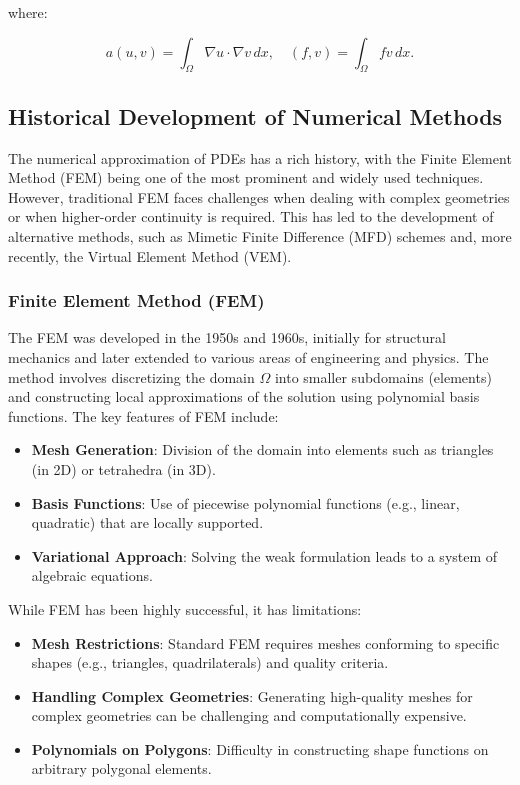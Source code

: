 \documentclass[class=article, crop=false]{standalone}
\begin{document}
where:

\[
a(u, v) = \int_\Omega \nabla u \cdot \nabla v \, dx, \quad (f, v) = \int_\Omega f v \, dx.
\]

\subsection{Historical Development of Numerical Methods}

The numerical approximation of PDEs has a rich history, with the Finite Element Method (FEM) being one of the most prominent and widely used techniques. However, traditional FEM faces challenges when dealing with complex geometries or when higher-order continuity is required. This has led to the development of alternative methods, such as Mimetic Finite Difference (MFD) schemes and, more recently, the Virtual Element Method (VEM).

\subsubsection{Finite Element Method (FEM)}

The FEM was developed in the 1950s and 1960s, initially for structural mechanics and later extended to various areas of engineering and physics. The method involves discretizing the domain $\Omega$ into smaller subdomains (elements) and constructing local approximations of the solution using polynomial basis functions. The key features of FEM include:

\begin{itemize}
    \item \textbf{Mesh Generation}: Division of the domain into elements such as triangles (in 2D) or tetrahedra (in 3D).
    \item \textbf{Basis Functions}: Use of piecewise polynomial functions (e.g., linear, quadratic) that are locally supported.
    \item \textbf{Variational Approach}: Solving the weak formulation leads to a system of algebraic equations.
\end{itemize}

While FEM has been highly successful, it has limitations:

\begin{itemize}
    \item \textbf{Mesh Restrictions}: Standard FEM requires meshes conforming to specific shapes (e.g., triangles, quadrilaterals) and quality criteria.
    \item \textbf{Handling Complex Geometries}: Generating high-quality meshes for complex geometries can be challenging and computationally expensive.
    \item \textbf{Polynomials on Polygons}: Difficulty in constructing shape functions on arbitrary polygonal elements.
\end{itemize}
\end{document}
